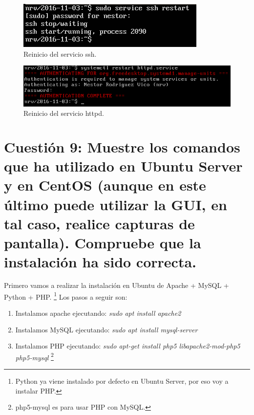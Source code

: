 \documentclass[a4paper,titlepage,12pt]{scrartcl}	%
\numberwithin{figure}{section} %
\numberwithin{table}{section} %
\begin{document}
	\begin{figure}[H]
		\includegraphics[width=\linewidth]{./Imagenes/8-restartubuntu.png}
		\vspace{-0.5cm}
		\caption[Reinicio del servicio ssh.]{Reinicio del servicio ssh.}
		\label{8-restartubuntu}
	\end{figure}
	
	\begin{figure}[H]
		\includegraphics[width=\linewidth]{./Imagenes/8-restartcentos.png}
		\vspace{-0.5cm}
		\caption[Reinicio del servicio httpd.]{Reinicio del servicio httpd.}
		\label{8-restartcentos}
	\end{figure}
	
	\section[Cuestión 9: Muestre los comandos que ha utilizado en Ubuntu Server y en CentOS (aunque en este último puede utilizar la GUI, en tal caso, realice capturas de pantalla). Compruebe que la instalación ha sido correcta.]{Cuestión 9: Muestre los comandos que ha utilizado en Ubuntu Server y en CentOS (aunque en este último puede utilizar la GUI, en tal caso, realice capturas de pantalla). Compruebe que la instalación ha sido correcta.}
	
	Primero vamos a realizar la instalación en Ubuntu de Apache + MySQL + Python + PHP. \footnote{Python ya viene instalado por defecto en Ubuntu Server, por eso voy a instalar PHP.} Los pasos a seguir son:	
	\begin{enumerate}
		\item Instalamos apache \cite{apache2ubuntu} ejecutando: \textit{sudo apt install apache2}
		\item Instalamos MySQL \cite{mysqlubuntu} ejecutando: \textit{sudo apt install mysql-server}
		\item Instalamos PHP \cite{phpubuntu} ejecutando: \textit{sudo apt-get install php5 libapache2-mod-php5 php5-mysql} \footnote{php5-mysql es para usar PHP con MySQL.}
	\end{enumerate}
	
\end{document}
